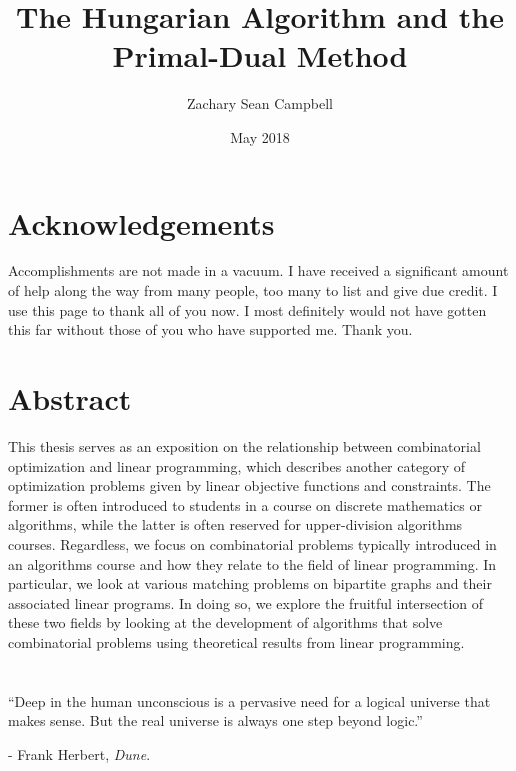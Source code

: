 \documentclass[12pt,twoside]{reedthesis}
\title{The Hungarian Algorithm and the Primal-Dual Method}
\author{Zachary Sean Campbell}
\date{May 2018}
\renewcommand{\'}{^{'}}
\theoremstyle{plain}
\theoremstyle{definition}
\begin{document}
    \maketitle
    \frontmatter %
    \pagestyle{empty} %

\chapter*{Acknowledgements}
Accomplishments are not made in a vacuum. I have received a significant amount of help along the way 
from many people, too many to list and give due credit. I use this page to thank all of you now. 
I most definitely would not have gotten this far without those of you who have supported me. Thank you.

\tableofcontents
\chapter*{Abstract}
This thesis serves as an exposition on the relationship between combinatorial optimization and linear 
programming, which describes another category of optimization problems given by linear objective 
functions and constraints. The former is often introduced to students in a course on discrete 
mathematics or algorithms, while the latter is often reserved for upper-division algorithms courses. 
Regardless, we focus on combinatorial problems typically introduced in an algorithms course and how 
they relate to the field of linear programming. In particular, we look at various matching problems 
on bipartite graphs and their associated linear programs. In doing so, we explore the fruitful 
intersection of these two fields by looking at the development of algorithms that solve combinatorial 
problems using theoretical results from linear programming.

\chapter*{}
``Deep in the human unconscious is a pervasive need for a logical universe that makes sense. But the 
real universe is always one step beyond logic.''

- Frank Herbert, \emph{Dune}.
\mainmatter %
\pagestyle{fancyplain} %
\end{document}

